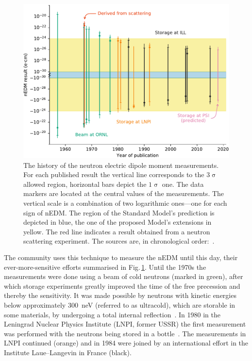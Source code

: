 \begin{figure}
  \centering
  \includegraphics[width=\linewidth]{gfx/introduction/edm_limits.pdf}
  \caption{The history of the neutron electric dipole moment measurements.
  For each published result the vertical line corresponds to the $3\upsigma$ allowed region, horizontal bars depict the $1\upsigma$ one.
  The data markers are located at the central values of the measurements.
  The vertical scale is a combination of two logarithmic ones---one for each sign of nEDM\@.
  The region of the Standard Model's prediction is depicted in blue, the one of the proposed Model's extensions in yellow.
  The red line indicates a result obtained from a neutron scattering experiment.
  The sources are, in chronological order:~\cite{PhysRev.108.120,PhysRevLett.19.381,PhysRevLett.19.384,PhysRev.170.1200,PhysRev.179.1285,PhysRevD.7.3147,PhysRevD.15.9,ALTAREV1980269,ALTAREV198113,altarev1986search,ALTAREV1992242,PENDLEBURY1984327,SMITH1990191,PhysRevLett.82.904,PhysRevLett.97.131801,Pendlebury2015}.}\label{fig:nEDM_limits_history}
\end{figure}

The community uses this technique to measure the nEDM until this day, their ever-more-sensitive efforts summarised in Fig.\,\ref{fig:nEDM_limits_history}.
Until the 1970s the measurements were done using a beam of cold neutrons (marked in green), after which storage experiments greatly improved the time of the free precession and thereby the sensitivity.
It was made possible by neutrons with kinetic energies below approximately \SI{300}{\nano\electronvolt} (referred to as ultracold), which are storable in some materials, by undergoing a total internal reflection~\cite{UCNbook}.
In 1980 in the Leningrad Nuclear Physics Institute (LNPI, former USSR) the first measurement was performed with the neutrons being stored in a bottle~\cite{ALTAREV1980269}.
The measurements in LNPI continued (orange) and in 1984 were joined by an international effort in the Institute Laue--Langevin in France (black).

